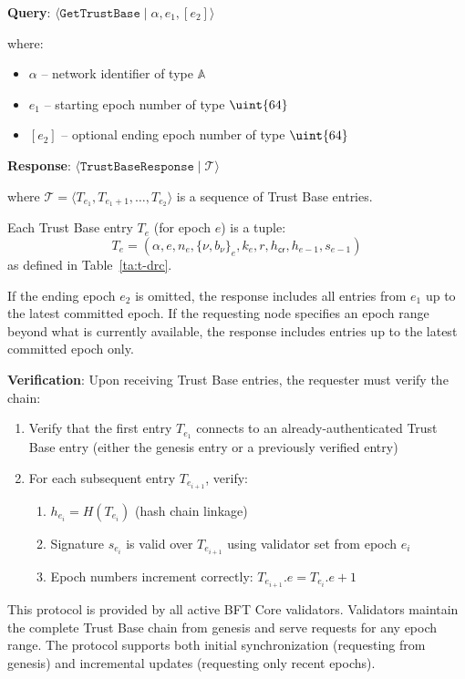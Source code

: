 \textbf{Query}: $\langle \texttt{GetTrustBase} \mid \alpha, e_1, [e_2] \rangle$

where:
\begin{itemize}
	\item $\alpha$ -- network identifier of type $\mathbb{A}$
	\item $e_1$ -- starting epoch number of type $\uint{64}$
	\item $[e_2]$ -- optional ending epoch number of type $\uint{64}$
\end{itemize}

\textbf{Response}: $\langle \texttt{TrustBaseResponse} \mid \mathcal{T} \rangle$

where $\mathcal{T} = \langle T_{e_1}, T_{e_1+1}, \ldots, T_{e_2} \rangle$ is a sequence of Trust Base entries.

Each Trust Base entry $T_e$ (for epoch $e$) is a tuple:
\[
T_e = (\alpha, e, n_e, \{\nu, b_\nu\}_e, k_e, r, h_{\mathsf{cr}}, h_{e-1}, s_{e-1})
\]
as defined in Table~\ref{ta:t-drc}.

If the ending epoch $e_2$ is omitted, the response includes all entries from $e_1$ up to the latest committed epoch. If the requesting node specifies an epoch range beyond what is currently available, the response includes entries up to the latest committed epoch only.

\textbf{Verification}: Upon receiving Trust Base entries, the requester must verify the chain:
\begin{enumerate}
	\item Verify that the first entry $T_{e_1}$ connects to an already-authenticated Trust Base entry (either the genesis entry or a previously verified entry)
	\item For each subsequent entry $T_{e_{i+1}}$, verify:
	\begin{enumerate}
		\item $h_{e_i} = H(T_{e_i})$ (hash chain linkage)
		\item Signature $s_{e_i}$ is valid over $T_{e_{i+1}}$ using validator set from epoch $e_i$
		\item Epoch numbers increment correctly: $T_{e_{i+1}}.e = T_{e_i}.e + 1$
	\end{enumerate}
\end{enumerate}

This protocol is provided by all active BFT Core validators. Validators maintain the complete Trust Base chain from genesis and serve requests for any epoch range. The protocol supports both initial synchronization (requesting from genesis) and incremental updates (requesting only recent epochs).


